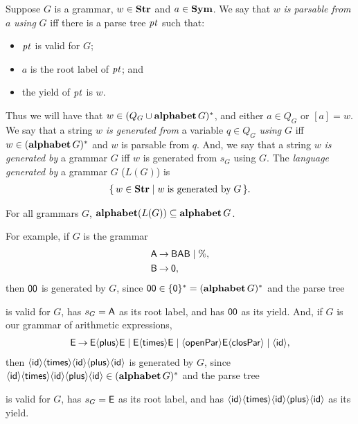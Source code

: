 %
Suppose $G$ is a grammar, $w\in\mathbf{Str}$ and $a\in\mathbf{Sym}$.  We say that $w$
\emph{is parsable from} $a$ \emph{using} $G$ iff there is a parse tree
${\it pt}$ such that:
\begin{itemize}
\item ${\it pt}$ is valid for $G$;

\item $a$ is the root label of ${\it pt}$; and

\item the yield of ${\it pt}$ is $w$.
\end{itemize}
Thus we will have that $w\in(Q_G\cup\mathbf{alphabet}\,G)^*$, and either
$a\in Q_G$ or $[a] = w$.
%
We say that a string $w$ \emph{is generated from} a variable $q\in Q_G$
\emph{using} $G$ iff $w\in(\mathbf{alphabet}\,G)^*$ and $w$ is parsable from
$q$.
%
%
%
And, we say that a string $w$ \emph{is generated by} a grammar $G$ iff
$w$ is generated from $s_G$ using $G$.
The \emph{language generated by} a grammar $G$ ($L(G)$) is
\begin{gather*}
\{ \, w\in\mathbf{Str} \mid w\;\allowbreak\mbox{is generated by}\allowbreak\;G \, \}.
\end{gather*}

\begin{proposition}
For all grammars $G$, $\mathbf{alphabet}(L(G))\subseteq\mathbf{alphabet}\,G$.
\end{proposition}

For example, if $G$ is the grammar
\begin{align*}
\mathsf{A} &\mathbin{\to} \mathsf{B}\mathsf{A}\mathsf{B} \mid \% , \\
\mathsf{B} &\mathbin{\to} \mathsf{0} ,
\end{align*}
then $\mathsf{0}\mathsf{0}$ is generated by $G$,
since $\mathsf{0}\mathsf{0}\in\{\mathsf{0}\}^*=(\mathbf{alphabet}\,G)^*$ and
the parse tree
\begin{center}

\end{center}
is valid for $G$, has $s_G=\mathsf{A}$ as its root label,
and has $\mathsf{0}\mathsf{0}$ as its yield.
And, if $G$ is our grammar of arithmetic expressions,
\begin{gather*}
\mathsf{E\mathbin{\to} E{\langle\mathsf{plus}\rangle} E\mid E{\langle\mathsf{times}\rangle} E\mid {\langle\mathsf{openPar}\rangle} E{\langle\mathsf{closPar}\rangle} \mid
{\langle\mathsf{id}\rangle}} ,
\end{gather*}
then ${\langle\mathsf{id}\rangle}{\langle\mathsf{times}\rangle}{\langle\mathsf{id}\rangle}{\langle\mathsf{plus}\rangle}{\langle\mathsf{id}\rangle}$ is generated by $G$,
since ${\langle\mathsf{id}\rangle}{\langle\mathsf{times}\rangle}{\langle\mathsf{id}\rangle}{\langle\mathsf{plus}\rangle}{\langle\mathsf{id}\rangle}\in(\mathbf{alphabet}\,G)^*$ and
the parse tree
\begin{center}

\end{center}
is valid for $G$, has $s_G=\mathsf{E}$ as its root label,
and has ${\langle\mathsf{id}\rangle}{\langle\mathsf{times}\rangle}{\langle\mathsf{id}\rangle}{\langle\mathsf{plus}\rangle}{\langle\mathsf{id}\rangle}$ as its yield.

